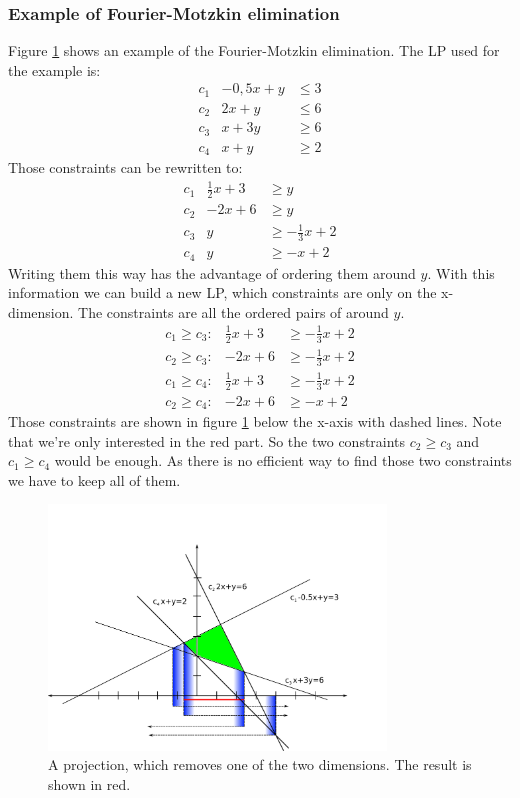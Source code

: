 \subsubsection*{Example of Fourier-Motzkin elimination}
Figure \ref{Fig:motzkinExample} shows an example of the Fourier-Motzkin elimination. The LP used for the example is:
\begin{eqnarray*}
c_1 & -0,5x + y & \leq 3 \\
c_2 & 2x + y & \leq 6 \\
c_3 & x+3y & \geq 6 \\
c_4 & x+y & \geq 2
\end{eqnarray*}
Those constraints can be rewritten to:
\begin{eqnarray*}
c_1 & \frac{1}{2}x + 3  & \geq y \\
c_2 & -2x+6 & \geq y \\
c_3 & y & \geq -\frac{1}{3}x+2 \\
c_4 & y & \geq -x+2
\end{eqnarray*}
Writing them this way has the advantage of ordering them around $y$. With this information we can build a new LP, which constraints are only on the x-dimension. The constraints are all the ordered pairs of around $y$.
\begin{eqnarray*}
c_1 \geq c_3: & \frac{1}{2}x + 3 & \geq -\frac{1}{3}x+2  \\
c_2 \geq c_3: & -2x+6 &  \geq -\frac{1}{3}x+2 \\
c_1 \geq c_4: & \frac{1}{2}x + 3   & \geq -\frac{1}{3}x+2 \\
c_2 \geq c_4: & -2x+6 & \geq -x+2
\end{eqnarray*}
Those constraints are shown in figure \ref{Fig:motzkinExample} below the x-axis with dashed lines. Note that we're only interested in the red part. So the two constraints $c_2 \geq c_3$ and $c_1 \geq c_4$ would be enough. As there is no efficient way to find those two constraints we have to keep all of them. 

\begin{figure}[hbt]
\begin{center}
\includegraphics[width=0.8\textwidth]{./images/motzkin.pdf} %
\end{center}
\caption{A projection, which removes one of the two dimensions. The result is shown in red.}
\label{Fig:motzkinExample}
\end{figure}

